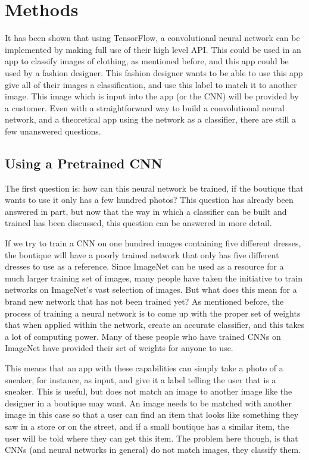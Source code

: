 \documentclass[12pt]{report} %
\begin{document}
\chapter{Methods}
	It has been shown that using TensorFlow, a convolutional neural network can be implemented by making full use of their high level API. This could be used in an app to classify images of clothing, as mentioned before, and this app could be used by a fashion designer. This fashion designer wants to be able to use this app give all of their images a classification, and use this label to match it to another image. This image which is input into the app (or the CNN) will be provided by a customer. Even with a straightforward way to build a convolutional neural network, and a theoretical app using the network as a classifier, there are still a few unanswered questions.
	
\section{Using a Pretrained CNN}
	The first question is: how can this neural network be trained, if the boutique that wants to use it only has a few hundred photos? This question has already been answered in part, but now that the way in which a classifier can be built and trained has been discussed, this question can be answered in more detail. 
	
	If we try to train a CNN on one hundred images containing five different dresses, the boutique will have a poorly trained network that only has five different dresses to use as a reference. Since ImageNet can be used as a resource for a much larger training set of images, many people have taken the initiative to train networks on ImageNet's vast selection of images. But what does this mean for a brand new network that has not been trained yet? As mentioned before, the process of training a neural network is to come up with the proper set of weights that when applied within the network, create an accurate classifier, and this takes a lot of computing power. Many of these people who have trained CNNs on ImageNet have provided their set of weights for anyone to use. 
	
	This means that an app with these capabilities can simply take a photo of a sneaker, for instance, as input, and give it a label telling the user that is a sneaker. This is useful, but does not match an image to another image like the designer in a boutique may want. An image needs to be matched with another image in this case so that a user can find an item that looks like something they saw in a store or on the street, and if a small boutique has a similar item, the user will be told where they can get this item. The problem here though, is that CNNs (and neural networks in general) do not match images, they classify them. 
\end{document}
